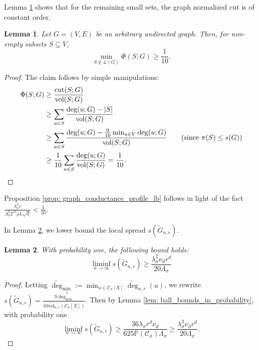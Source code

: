\documentclass[11pt,twoside]{article}
\newtheorem{lemma}{Lemma}
\DeclarePairedDelimiter\abs{\lvert}{\rvert}
\newcommand{\vol}{\mathrm{vol}}
\newcommand{\cut}{\mathrm{cut}}
\newcommand{\1}{\mathbf{1}}
\newcommand{\Xbf}{X}             %
\newcommand{\Pbb}{\mathbb{P}}
\newcommand{\Cset}{\mathcal{C}}
\newcommand{\Csig}{\Cset_{\sigma}}
\newcommand{\degminwt}{\widetilde{\deg}_{\min}}
\begin{document}
Lemma \ref{lem: graph_conductance_profile_lb_1} shows that for the remaining small sets, the graph normalized cut is of constant order. 
\begin{lemma}
	\label{lem: graph_conductance_profile_lb_1}
	Let $G = (V,E)$ be an arbitrary undirected graph. Then, for non-empty subsets $S \subseteq V$, 
	\begin{equation*}
	\min_{S \not\in \mathcal{L}(G)}\Phi(S; G) \geq \frac{1}{10}.
	\end{equation*}
\end{lemma}
\begin{proof}
	The claim follows by simple manipulations:
	\begin{align*}
	\Phi(S;G) & \geq \frac{\cut(S;G)}{\vol(S;G)} \\
	& \geq \sum_{u \in S} \frac{\deg(u;G) - \abs{S}}{\vol(S;G)} \\
	& \geq \sum_{u \in S} \frac{\deg(u;G) - \frac{9}{10} \min_{u \in V}\deg(u;G)}{\vol(S;G)} \tag{since $\pi(S) \leq s(G)$}\\ 
	& \geq \frac{1}{10} \sum_{u \in S} \frac{\deg(u;G)}{\vol(S;G)} = \frac{1}{10}.
	\end{align*}
\end{proof}

Proposition \ref{prop: graph_conductance_profile_lb} follows in light of the fact $\frac{\lambda_{\sigma}^2 r}{\Lambda_{\sigma}^2 2^{13} \rho L \sqrt{d}} < \frac{1}{10}$.

In Lemma \ref{lem: local_spread_lb}, we lower bound the local spread $s(\widetilde{G}_{n,r})$.

\begin{lemma}
	\label{lem: local_spread_lb}
	With probability one, the following bound holds:
	\begin{equation*}
	\liminf_{n \to \infty} s(\widetilde{G}_{n,r}) \geq \frac{\lambda_{\sigma}^2 \nu_d r^d}{20\Lambda_{\sigma}} 
	\end{equation*}
\end{lemma}
\begin{proof}
	Letting $\degminwt := \min_{u \in \Csig[\Xbf]} \widetilde{\deg}_{n,r}(u)$, we rewrite $s(\widetilde{G}_{n,r}) = \frac{9 \degminwt^2}{10\widetilde{\vol}_{n,r}(\Csig[\Xbf])}$. Then by Lemma \ref{lem: ball_bounds_in_probability}, with probability one
	\begin{equation*}
	\liminf_{n \to \infty} s(\widetilde{G}_{n,r}) \geq \frac{36 \lambda_{\sigma} r^d \nu_d}{625 \Pbb(\Csig) \Lambda_{\sigma}} \geq \frac{\lambda_{\sigma}^2 \nu_d r^d}{20\Lambda_{\sigma}}.
	\end{equation*}
\end{proof}
\end{document}

